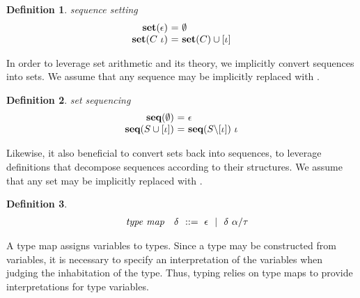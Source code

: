 \documentclass[table,dvipsnames,acmsmall]{acmart}
\theoremstyle{definition}
\newtheorem{definition}{Definition}[section]
\begin{document}
\begin{definition} 
  \label{def:sequence_setting}
  \emph{sequence setting}
  \hfill 
  \small
  \nopad
  \[
  \begin{array}[t]{r@{}c@{}l}
      \textbf{set}(\epsilon)
      &\ =\ & 
      \emptyset 

      \\

      \textbf{set}(C\ \iota)
      &\ =\ & 
      \textbf{set}(C) \cup [ \iota ] 
  \end{array}
  \]
\end{definition} 

\noindent
In order to leverage set arithmetic and its theory,
we implicitly convert sequences into sets. 
We assume that any sequence  may be implicitly replaced with .

\begin{definition} 
  \label{def:set_sequencing}
  \emph{set sequencing}
  \hfill 
  \small
  \nopad
  \\
  \[
  \begin{array}[t]{r@{}c@{}l}
      \textbf{seq}(\emptyset)
      &\ =\ & 
      \epsilon 

      \\

      \textbf{seq}(S \cup [\iota])
      &\ =\ & 
      \textbf{seq}(S \backslash [\iota])\ \iota 
  \end{array}
  \]
\end{definition} 

\noindent
Likewise, it also beneficial to convert sets back into sequences, to leverage
definitions that decompose sequences according to their structures. 
We assume that any set  may be implicitly replaced with .

\begin{definition}
  \label{def:type_map}
  \small
  \nopad
  \[\begin{array}[t]{rr@{}l}
    \com{type map} &
    \nonterm{\delta} & \is \epsilon \sep \delta\ \alpha \slash \tau
  \end{array}\]
\end{definition}

\noindent
A type map assigns variables to types.
Since a type may be constructed from variables, it 
is necessary to specify an interpretation of the variables
when judging the inhabitation of the type.
Thus, typing relies on type maps to provide interpretations
for type variables.
\end{document}
